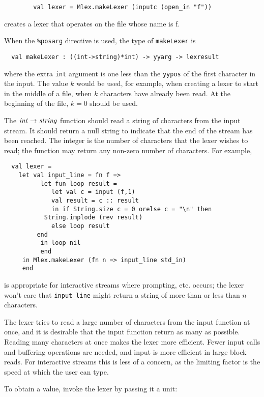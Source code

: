 \begin{verbatim}
        val lexer = Mlex.makeLexer (inputc (open_in "f"))
\end{verbatim}

creates a lexer that operates on the file whose name is f.

When the {\tt \%posarg} directive is used, the type of
{\tt makeLexer} is 
\begin{verbatim}
  val makeLexer : ((int->string)*int) -> yyarg -> lexresult
\end{verbatim}
where the extra {\tt int} argument is one less than the {\tt yypos}
of the first character in the input.  The value $k$ would be used,
for example, when creating
a lexer to start in the middle of a file, when $k$ characters have
already been read.  At the beginning of the file, $k=0$ should be used.

The ${\it int} \rightarrow {\it string}$ function
should read a string of characters
from the input stream.  It should return a null string to indicate
that the end of the stream has been reached.  The integer is the
number of characters that the lexer wishes to read; the function may
return any non-zero number of characters.  For example, 

\begin{verbatim}
  val lexer = 
    let val input_line = fn f =>
          let fun loop result =
             let val c = input (f,1)
	         val result = c :: result
             in if String.size c = 0 orelse c = "\n" then
	  	   String.implode (rev result)
	         else loop result
	     end
          in loop nil
          end
     in Mlex.makeLexer (fn n => input_line std_in)
     end
\end{verbatim}

is appropriate for interactive streams where prompting, etc.  occurs;
the lexer won't care that \verb|input_line| might return a string of more
than or less than $n$ characters.

The lexer tries to read a large number of characters from the input
function at once, and it is desirable that the input function return
as many as possible.  Reading many characters at once makes the lexer
more efficient.  Fewer input calls and buffering operations are
needed, and input is more efficient in large block reads.  For
interactive streams this is less of a concern, as the limiting factor
is the speed at which the user can type.

To obtain a value, invoke the lexer by passing it a unit:

